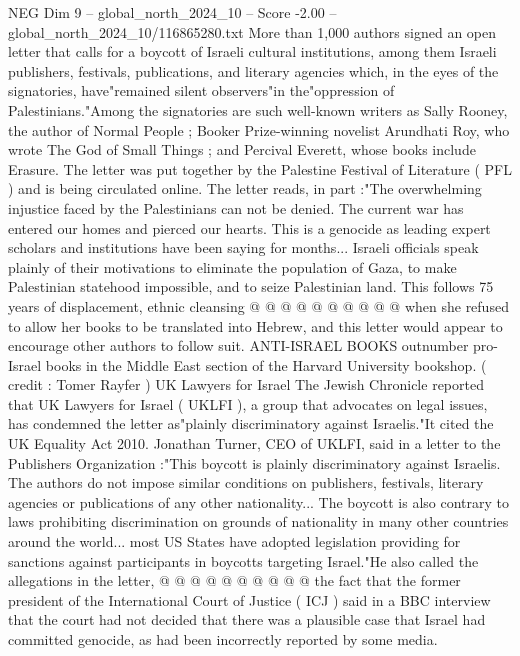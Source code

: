 \begin{textsample}{NEG Dim 9 – global\_north\_2024\_10 – Score -2.00 – global\_north\_2024\_10/116865280.txt}  \label{ex:f9_neg_233}
More than 1,000 authors signed an open letter that calls for a boycott of Israeli cultural institutions, among them Israeli publishers, festivals, publications, and literary agencies which, in the eyes of the signatories, have"remained silent observers"in the"oppression of Palestinians."Among the signatories are such well-known writers as Sally Rooney, the author of Normal People ; Booker Prize-winning novelist Arundhati Roy, who wrote The God of Small Things ; and Percival Everett, whose books include Erasure.
The letter was put together by the Palestine Festival of Literature ( PFL ) and is being circulated online.
The letter reads, in part :"The overwhelming injustice faced by the Palestinians can not be denied.
The current war has entered our homes and pierced our hearts.
This is a genocide as leading expert scholars and institutions have been saying for months...
Israeli officials speak plainly of their motivations to eliminate the population of Gaza, to make Palestinian statehood impossible, and to seize Palestinian land.
This follows 75 years of displacement, ethnic cleansing @ @ @ @ @ @ @ @ @ @ when she refused to allow her books to be translated into Hebrew, and this letter would appear to encourage other authors to follow suit.
ANTI-ISRAEL BOOKS outnumber pro-Israel books in the Middle East section of the Harvard University bookshop. ( credit : Tomer Rayfer ) UK Lawyers for Israel The Jewish Chronicle reported that UK Lawyers for Israel ( UKLFI ), a group that advocates on legal issues, has condemned the letter as"plainly discriminatory against Israelis."It cited the UK Equality Act 2010.
Jonathan Turner, CEO of UKLFI, said in a letter to the Publishers Organization :"This boycott is plainly discriminatory against Israelis.
The authors do not impose similar conditions on publishers, festivals, literary agencies or publications of any other nationality...
The boycott is also contrary to laws prohibiting discrimination on grounds of nationality in many other countries around the world... most US States have adopted legislation providing for sanctions against participants in boycotts targeting Israel."He also called the allegations in the letter, @ @ @ @ @ @ @ @ @ @ the fact that the former president of the International Court of Justice ( ICJ ) said in a BBC interview that the court had not decided that there was a plausible case that Israel had committed genocide, as had been incorrectly reported by some media.

\end{textsample}
